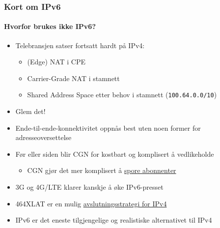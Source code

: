 \begin{frame}%
  \frametitle{Kort om IPv6}
  \framesubtitle{Hvorfor brukes ikke IPv6?}
  \begin{itemize}[<+->]
  \item Telebransjen satser fortsatt hardt på IPv4:
    \begin{itemize}[<+->]
    \item (Edge) NAT i CPE\hfill{}
    \item Carrier-Grade NAT i stamnett\hfill{}
    \item Shared Address Space etter behov i stamnett (\texttt{100.64.0.0/10})\hfill{}
    \end{itemize}
  \item Glem det!
  \item Ende-til-ende-konnektivitet oppnås best uten noen former for
    adresseoversettelse
  \item Før eller siden blir CGN for kostbart og komplisert å vedlikeholde
    \begin{itemize}[<+->]
    \item CGN gjør det mer komplisert å
      \href{http://www.nyteknik.se/nyheter/it_telekom/allmant/article3904264.ece}{spore
        abonnenter}
    \end{itemize}
  \item 3G og 4G/LTE klarer kanskje å øke IPv6-presset\hfill{}
  \item 464XLAT er en mulig
    \href{https://conference.apnic.net/data/37/464xlat-apricot-2014_1393236641.pdf}{avslutningsstrategi
      for IPv4}\hfill{}
  \item \alert<9>{IPv6 er det eneste tilgjengelige og realistiske alternativet til IPv4}
  \end{itemize}
\end{frame}

